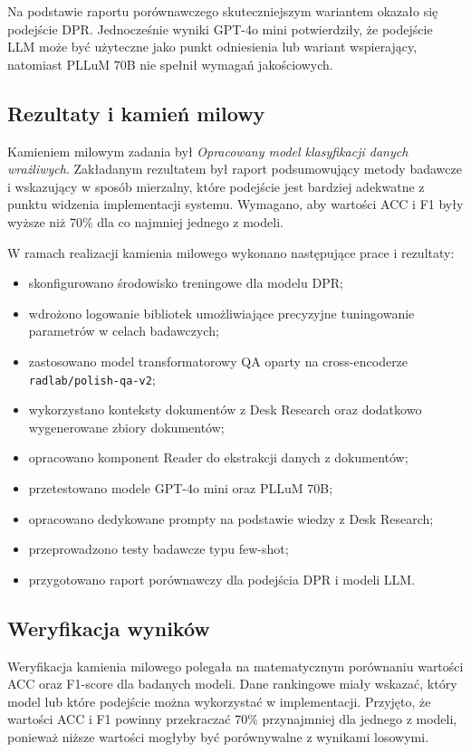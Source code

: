 \documentclass[12pt,a4paper]{report}
\begin{document}
Na podstawie raportu porównawczego skuteczniejszym wariantem okazało się podejście DPR. Jednocześnie wyniki GPT-4o mini potwierdziły, że podejście LLM może być użyteczne jako punkt odniesienia lub wariant wspierający, natomiast PLLuM 70B nie spełnił wymagań jakościowych.

\subsection{Rezultaty i kamień milowy}
Kamieniem milowym zadania był \textit{Opracowany model klasyfikacji danych wrażliwych}. Zakładanym rezultatem był raport podsumowujący metody badawcze i wskazujący w sposób mierzalny, które podejście jest bardziej adekwatne z punktu widzenia implementacji systemu. Wymagano, aby wartości ACC i F1 były wyższe niż 70\% dla co najmniej jednego z modeli.

W ramach realizacji kamienia milowego wykonano następujące prace i rezultaty:

\begin{itemize}
    \item skonfigurowano środowisko treningowe dla modelu DPR;
    \item wdrożono logowanie bibliotek umożliwiające precyzyjne tuningowanie parametrów w celach badawczych;
    \item zastosowano model transformatorowy QA oparty na cross-encoderze \texttt{radlab/polish-qa-v2};
    \item wykorzystano konteksty dokumentów z Desk Research oraz dodatkowo wygenerowane zbiory dokumentów;
    \item opracowano komponent Reader do ekstrakcji danych z dokumentów;
    \item przetestowano modele GPT-4o mini oraz PLLuM 70B;
    \item opracowano dedykowane prompty na podstawie wiedzy z Desk Research;
    \item przeprowadzono testy badawcze typu few-shot;
    \item przygotowano raport porównawczy dla podejścia DPR i modeli LLM.
\end{itemize}

\subsection{Weryfikacja wyników}
Weryfikacja kamienia milowego polegała na matematycznym porównaniu wartości ACC oraz F1-score dla badanych modeli. Dane rankingowe miały wskazać, który model lub które podejście można wykorzystać w implementacji. Przyjęto, że wartości ACC i F1 powinny przekraczać 70\% przynajmniej dla jednego z modeli, ponieważ niższe wartości mogłyby być porównywalne z wynikami losowymi.
\end{document}
